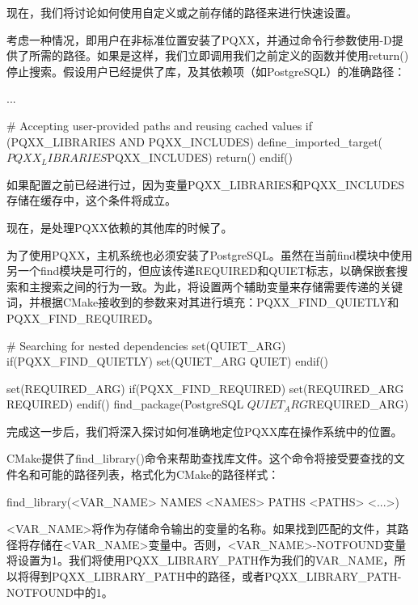 现在，我们将讨论如何使用自定义或之前存储的路径来进行快速设置。


考虑一种情况，即用户在非标准位置安装了PQXX，并通过命令行参数使用-D提供了所需的路径。如果是这样，我们立即调用我们之前定义的函数并使用return()停止搜索。假设用户已经提供了库，及其依赖项（如PostgreSQL）的准确路径：


\begin{cmake}
...

# Accepting user-provided paths and reusing cached values
if (PQXX_LIBRARIES AND PQXX_INCLUDES)
    define_imported_target(${PQXX_LIBRARIES} ${PQXX_INCLUDES})
    return()
endif()
\end{cmake}

如果配置之前已经进行过，因为变量PQXX\_LIBRARIES和PQXX\_INCLUDES存储在缓存中，这个条件将成立。

现在，是处理PQXX依赖的其他库的时候了。


为了使用PQXX，主机系统也必须安装了PostgreSQL。虽然在当前find模块中使用另一个find模块是可行的，但应该传递REQUIRED和QUIET标志，以确保嵌套搜索和主搜索之间的行为一致。为此，将设置两个辅助变量来存储需要传递的关键词，并根据CMake接收到的参数来对其进行填充：PQXX\_FIND\_QUIETLY和PQXX\_FIND\_REQUIRED。

\begin{cmake}
# Searching for nested dependencies
set(QUIET_ARG)
if(PQXX_FIND_QUIETLY)
    set(QUIET_ARG QUIET)
endif()

set(REQUIRED_ARG)
if(PQXX_FIND_REQUIRED)
    set(REQUIRED_ARG REQUIRED)
endif()
find_package(PostgreSQL ${QUIET_ARG} ${REQUIRED_ARG})
\end{cmake}

完成这一步后，我们将深入探讨如何准确地定位PQXX库在操作系统中的位置。


CMake提供了find\_library()命令来帮助查找库文件。这个命令将接受要查找的文件名和可能的路径列表，格式化为CMake的路径样式：

\begin{shell}
find_library(<VAR_NAME> NAMES <NAMES> PATHS <PATHS> <...>)
\end{shell}

<VAR\_NAME>将作为存储命令输出的变量的名称。如果找到匹配的文件，其路径将存储在<VAR\_NAME>变量中。否则，<VAR\_NAME>-NOTFOUND变量将设置为1。我们将使用PQXX\_LIBRARY\_PATH作为我们的VAR\_NAME，所以将得到PQXX\_LIBRARY\_PATH中的路径，或者PQXX\_LIBRARY\_PATH-NOTFOUND中的1。

